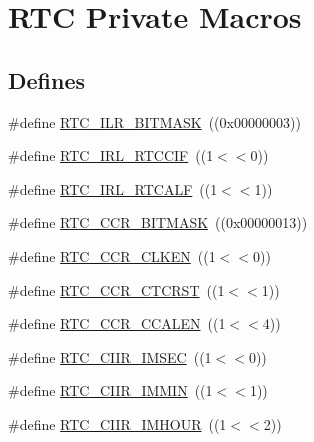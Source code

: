 \hypertarget{group___r_t_c___private___macros}{\section{\-R\-T\-C \-Private \-Macros}
\label{group___r_t_c___private___macros}
}
\subsection*{\-Defines}
\begin{DoxyCompactItemize}
\item 
\#define \hyperlink{group___r_t_c___private___macros_ga9c00baff0fca4f8e747fadfe9ee12775}{\-R\-T\-C\-\_\-\-I\-L\-R\-\_\-\-B\-I\-T\-M\-A\-S\-K}~((0x00000003))
\item 
\#define \hyperlink{group___r_t_c___private___macros_gaf706fff68e830a082d476467fe71f297}{\-R\-T\-C\-\_\-\-I\-R\-L\-\_\-\-R\-T\-C\-C\-I\-F}~((1$<$$<$0))
\item 
\#define \hyperlink{group___r_t_c___private___macros_ga237351d2c7f08b447254eff9578eb11e}{\-R\-T\-C\-\_\-\-I\-R\-L\-\_\-\-R\-T\-C\-A\-L\-F}~((1$<$$<$1))
\item 
\#define \hyperlink{group___r_t_c___private___macros_gadc461b6f544d66841e09499b2b9734c7}{\-R\-T\-C\-\_\-\-C\-C\-R\-\_\-\-B\-I\-T\-M\-A\-S\-K}~((0x00000013))
\item 
\#define \hyperlink{group___r_t_c___private___macros_gad08af035635f5acd7931cb982f95e771}{\-R\-T\-C\-\_\-\-C\-C\-R\-\_\-\-C\-L\-K\-E\-N}~((1$<$$<$0))
\item 
\#define \hyperlink{group___r_t_c___private___macros_ga70900054432c82dad7d63d4598502923}{\-R\-T\-C\-\_\-\-C\-C\-R\-\_\-\-C\-T\-C\-R\-S\-T}~((1$<$$<$1))
\item 
\#define \hyperlink{group___r_t_c___private___macros_gaeb77b2340d896fae77ea670bb70e972e}{\-R\-T\-C\-\_\-\-C\-C\-R\-\_\-\-C\-C\-A\-L\-E\-N}~((1$<$$<$4))
\item 
\#define \hyperlink{group___r_t_c___private___macros_gae3ce6f77e52bc9e0522d1800f617c3fc}{\-R\-T\-C\-\_\-\-C\-I\-I\-R\-\_\-\-I\-M\-S\-E\-C}~((1$<$$<$0))
\item 
\#define \hyperlink{group___r_t_c___private___macros_gaa4c8b779d5bb327cde276ae30b5d2f32}{\-R\-T\-C\-\_\-\-C\-I\-I\-R\-\_\-\-I\-M\-M\-I\-N}~((1$<$$<$1))
\item 
\#define \hyperlink{group___r_t_c___private___macros_ga9691dd6beea1cafb0b8731c3eef10e2f}{\-R\-T\-C\-\_\-\-C\-I\-I\-R\-\_\-\-I\-M\-H\-O\-U\-R}~((1$<$$<$2))
\item 

\end{DoxyCompactItemize}
